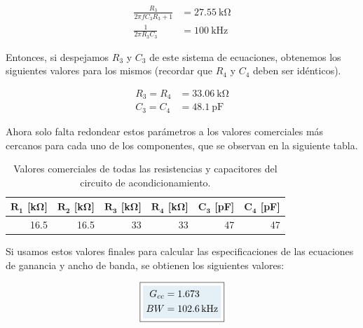 \begin{equation}\label{sist_eq}
    \begin{aligned}
        \frac{R_3}{2\pi fC_3R_3 + 1} &= \SI[]{27.55}[]{\kilo\ohm}\\
        \frac{1}{2\pi R_3C_3}        &= \SI[]{100}[]{\kilo\hertz}
    \end{aligned}
\end{equation}

Entonces, si despejamos $R_3$ y $C_3$ de este sistema de ecuaciones, obtenemos los siguientes valores para los mismos (recordar que $R_4$ y $C_4$ deben ser idénticos).

\begin{equation*}
    \begin{aligned}
        R_3 = R_4 &= \SI[]{33.06}[]{\kilo\ohm}\\
        C_3 = C_4 &= \SI[]{48.1}[]{\pico\farad}
    \end{aligned}
\end{equation*}

Ahora solo falta redondear estos parámetros a los valores comerciales más cercanos para cada uno de los componentes, que se observan en la siguiente tabla.\\

\setlength{\tabcolsep}{8pt}
\renewcommand{\arraystretch}{1.5}
\begin{table}[H]
\begin{center}
    \begin{tabular}{rrrrrr}
    $\mathbf{R_1}$ [\unit{\kilo\ohm}] & $\mathbf{R_2}$ [\unit{\kilo\ohm}] & $\mathbf{R_3}$ [\unit{\kilo\ohm}] & $\mathbf{R_4}$ [\unit{\kilo\ohm}] & $\mathbf{C_3}$ [\unit{\pico\farad}] & $\mathbf{C_4}$ [\unit{\pico\farad}]\\
    \hline
    \num{16.5} & \num{16.5} & \num{33} & \num{33} & \num{47} & \num{47}
    \end{tabular}
    \caption{Valores comerciales de todas las resistencias y capacitores del circuito de acondicionamiento.}
    \label{tabla:componentes_acond}
\end{center}
\end{table}

Si usamos estos valores finales para calcular las especificaciones de las ecuaciones de ganancia y ancho de banda, se obtienen los siguientes valores:

\begin{equation*}
    \boxed{\highlight{
    \begin{aligned}
        G_{cc} &= \num{1.673}\\
        BW &= \SI[]{102.6}[]{\kilo\hertz}
    \end{aligned}
    }}
\end{equation*}

